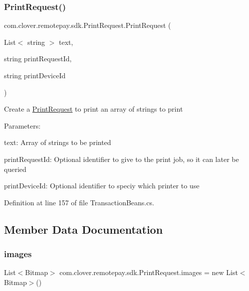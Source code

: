 \subsubsection{\texorpdfstring{Print\+Request()}{PrintRequest()}\hspace{0.1cm}{\footnotesize\ttfamily [4/4]}}
{\footnotesize\ttfamily com.\+clover.\+remotepay.\+sdk.\+Print\+Request.\+Print\+Request (\begin{DoxyParamCaption}\item[{List$<$ string $>$}]{text,  }\item[{string}]{print\+Request\+Id,  }\item[{string}]{print\+Device\+Id }\end{DoxyParamCaption})}

Create a \hyperlink{classcom_1_1clover_1_1remotepay_1_1sdk_1_1_print_request}{Print\+Request} to print an array of strings to print


\begin{DoxyItemize}
\item Parameters\+:
\begin{DoxyItemize}
\item text\+: Array of strings to be printed
\item print\+Request\+Id\+: Optional identifier to give to the print job, so it can later be queried
\item print\+Device\+Id\+: Optional identifier to speciy which printer to use 
\end{DoxyItemize}
\end{DoxyItemize}

Definition at line 157 of file Transaction\+Beans.\+cs.



\subsection{Member Data Documentation}
\mbox{\label{classcom_1_1clover_1_1remotepay_1_1sdk_1_1_print_request_aa33c8be7efaa3726d2f71a2df1e4020d}} 
\subsubsection{\texorpdfstring{images}{images}}
{\footnotesize\ttfamily List$<$Bitmap$>$ com.\+clover.\+remotepay.\+sdk.\+Print\+Request.\+images = new List$<$Bitmap$>$()}



